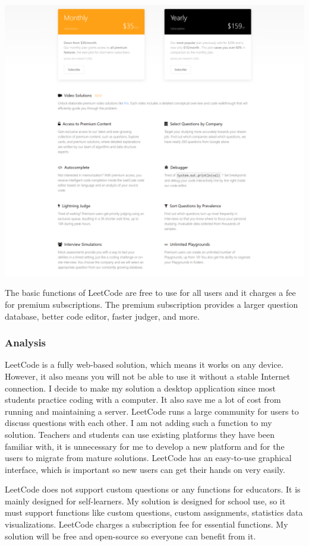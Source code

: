 \documentclass[a4paper]{report}
\begin{document}
\includegraphics[width=\linewidth]{LeetCode-Premium}

The basic functions of LeetCode are free to use for all users and it charges a fee for premium subscriptions. The premium subscription provides a larger question database, better code editor, faster judger, and more.

\subsubsection{Analysis}

LeetCode is a fully web-based solution, which means it works on any device. However, it also means you will not be able to use it without a stable Internet connection. I decide to make my solution a desktop application since most students practice coding with a computer. It also save me a lot of cost from running and maintaining a server. LeetCode runs a large community for users to discuss questions with each other. I am not adding such a function to my solution. Teachers and students can use existing platforms they have been familiar with, it is unnecessary for me to develop a new platform and for the users to migrate from mature solutions. LeetCode has an easy-to-use graphical interface, which is important so new users can get their hands on very easily. 

LeetCode does not support custom questions or any functions for educators. It is mainly designed for self-learners. My solution is designed for school use, so it must support functions like custom questions, custom assignments, statistics data visualizations. LeetCode charges a subscription fee for essential functions. My solution will be free and open-source so everyone can benefit from it.
\end{document}
